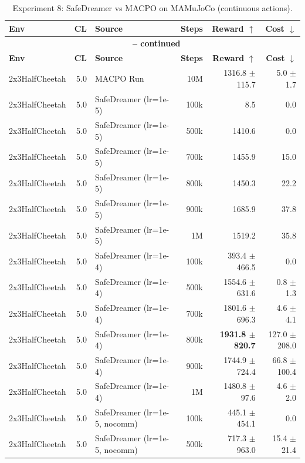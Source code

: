 \begin{longtable}{l r l r r r}
\caption{Experiment 8: SafeDreamer vs MACPO on MAMuJoCo (continuous actions).}
\label{tab:mamujoco_experiment8} \\
\toprule
\textbf{Env} & \textbf{CL} & \textbf{Source} & \textbf{Steps} & \multicolumn{1}{r}{\textbf{Reward} $\uparrow$} & \multicolumn{1}{r}{\textbf{Cost} $\downarrow$} \\
\midrule
\endfirsthead
\multicolumn{6}{c}{{\bfseries \tablename\ \thetable{} -- continued}} \\
\toprule
\textbf{Env} & \textbf{CL} & \textbf{Source} & \textbf{Steps} & \multicolumn{1}{r}{\textbf{Reward} $\uparrow$} & \multicolumn{1}{r}{\textbf{Cost} $\downarrow$} \\
\midrule
\endhead
\bottomrule
\endlastfoot
2x3HalfCheetah & 5.0 & MACPO Run & 10M & 1316.8 $\pm$ 115.7 & 5.0 $\pm$ 1.7 \\
2x3HalfCheetah & 5.0 & SafeDreamer (lr=1e-5) & 100k & 8.5 & 0.0 \\
2x3HalfCheetah & 5.0 & SafeDreamer (lr=1e-5) & 500k & 1410.6 & 0.0 \\
2x3HalfCheetah & 5.0 & SafeDreamer (lr=1e-5) & 700k & 1455.9 & 15.0 \\
2x3HalfCheetah & 5.0 & SafeDreamer (lr=1e-5) & 800k & 1450.3 & 22.2 \\
2x3HalfCheetah & 5.0 & SafeDreamer (lr=1e-5) & 900k & 1685.9 & 37.8 \\
2x3HalfCheetah & 5.0 & SafeDreamer (lr=1e-5) & 1M & 1519.2 & 35.8 \\
2x3HalfCheetah & 5.0 & SafeDreamer (lr=1e-4) & 100k & 393.4 $\pm$ 466.5 & 0.0 \\
2x3HalfCheetah & 5.0 & SafeDreamer (lr=1e-4) & 500k & 1554.6 $\pm$ 631.6 & 0.8 $\pm$ 1.3 \\
2x3HalfCheetah & 5.0 & SafeDreamer (lr=1e-4) & 700k & 1801.6 $\pm$ 696.3 & 4.6 $\pm$ 4.1 \\
2x3HalfCheetah & 5.0 & SafeDreamer (lr=1e-4) & 800k & \textbf{1931.8 $\pm$ 820.7} & 127.0 $\pm$ 208.0 \\
2x3HalfCheetah & 5.0 & SafeDreamer (lr=1e-4) & 900k & 1744.9 $\pm$ 724.4 & 66.8 $\pm$ 100.4 \\
2x3HalfCheetah & 5.0 & SafeDreamer (lr=1e-4) & 1M & 1480.8 $\pm$ 97.6 & 4.6 $\pm$ 2.0 \\
2x3HalfCheetah & 5.0 & SafeDreamer (lr=1e-5, nocomm) & 100k & 445.1 $\pm$ 454.1 & 0.0 \\
2x3HalfCheetah & 5.0 & SafeDreamer (lr=1e-5, nocomm) & 500k & 717.3 $\pm$ 963.0 & 15.4 $\pm$ 21.4 \\

\end{longtable}
